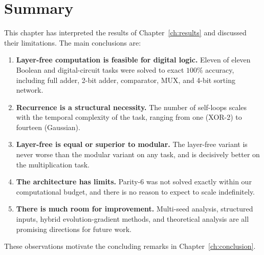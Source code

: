 \section{Summary}
\label{sec:disc-summary}

This chapter has interpreted the results of Chapter~\ref{ch:results}
and discussed their limitations. The main conclusions are:

\begin{enumerate}
  \item \textbf{Layer-free computation is feasible for digital logic.}
    Eleven of eleven Boolean and digital-circuit tasks were solved to
    exact $100\%$ accuracy, including full adder, 2-bit adder,
    comparator, MUX, and 4-bit sorting network.

  \item \textbf{Recurrence is a structural necessity.} The number of
    self-loops scales with the temporal complexity of the task,
    ranging from one (XOR-2) to fourteen (Gaussian).

  \item \textbf{Layer-free is equal or superior to modular.} The
    layer-free variant is never worse than the modular variant on any
    task, and is decisively better on the multiplication task.

  \item \textbf{The architecture has limits.} Parity-6 was not solved
    exactly within our computational budget, and there is no reason to
    expect \modnet{} to scale indefinitely.

  \item \textbf{There is much room for improvement.} Multi-seed
    analysis, structured inputs, hybrid evolution-gradient methods,
    and theoretical analysis are all promising directions for future
    work.
\end{enumerate}

These observations motivate the concluding remarks in
Chapter~\ref{ch:conclusion}.

